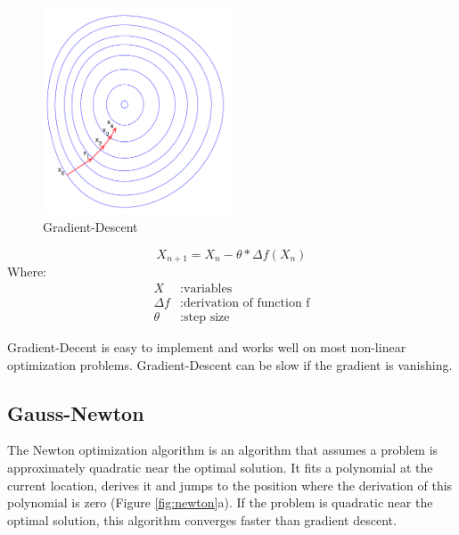 \documentclass[11pt,a4paper,titlepage,oneside]{report}
\begin{document}
\begin{figure}[H]
  \begin{center}
    \includegraphics[width=0.5\textwidth]{img/gradient_descent.png}
  \end{center}
    \caption{Gradient-Descent}\label{fig:gradient_descent}
\end{figure}

\begin{equation}\label{eq:gradient_descent}
  X_{n+1}=X_n-\theta*\Delta f(X_n)
\end{equation}
Where:
\begin{align*}
  X		      &: \text{variables}\\
  \Delta f  &: \text{derivation of function f}\\
  \theta    &: \text{step size}
\end{align*}

Gradient-Decent is easy to implement and works well on most non-linear optimization problems. Gradient-Descent can be slow if the gradient is vanishing.

\subsection{Gauss-Newton}
The Newton optimization algorithm is an algorithm that assumes a problem is approximately quadratic near the optimal solution. It fits a polynomial at the current location, derives it and jumps to the position where the derivation of this polynomial is zero (Figure \ref{fig:newton}a). If the problem is quadratic near the optimal solution, this algorithm converges faster than gradient descent.
\end{document}

